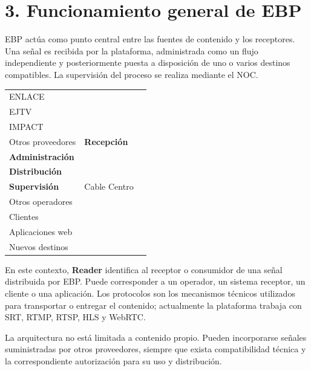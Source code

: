 \section{3. Funcionamiento general de EBP}
EBP actúa como punto central entre las fuentes de contenido y los receptores. Una señal es recibida por la plataforma, administrada como un flujo independiente y posteriormente puesta a disposición de uno o varios destinos compatibles. La supervisión del proceso se realiza mediante el NOC.

\begin{tabularx}{\textwidth}{|Y|Y|Y|}\hline
{} &  &  \\ \hline
ENLACE\\EJTV\\IMPACT\\Otros proveedores & \textbf{Recepción}\\\textbf{Administración}\\\textbf{Distribución}\\\textbf{Supervisión} & Cable Centro\\Otros operadores\\Clientes\\Aplicaciones web\\Nuevos destinos \\ \hline
\end{tabularx}

En este contexto, \textbf{Reader} identifica al receptor o consumidor de una señal distribuida por EBP. Puede corresponder a un operador, un sistema receptor, un cliente o una aplicación. Los protocolos son los mecanismos técnicos utilizados para transportar o entregar el contenido; actualmente la plataforma trabaja con SRT, RTMP, RTSP, HLS y WebRTC.

La arquitectura no está limitada a contenido propio. Pueden incorporarse señales suministradas por otros proveedores, siempre que exista compatibilidad técnica y la correspondiente autorización para su uso y distribución.
